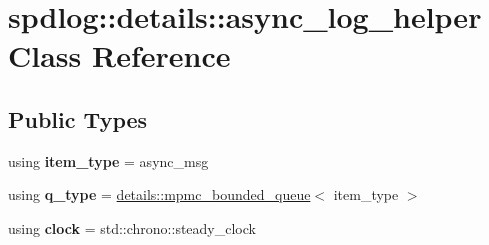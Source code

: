 \hypertarget{classspdlog_1_1details_1_1async__log__helper}{}\section{spdlog\+:\+:details\+:\+:async\+\_\+log\+\_\+helper Class Reference}
\label{classspdlog_1_1details_1_1async__log__helper}
\subsection*{Public Types}
\begin{DoxyCompactItemize}
\item 
using {\bfseries item\+\_\+type} = async\+\_\+msg\hypertarget{classspdlog_1_1details_1_1async__log__helper_a697d7c2f16fe34871f560eeb50bdb8f9}{}\label{classspdlog_1_1details_1_1async__log__helper_a697d7c2f16fe34871f560eeb50bdb8f9}

\item 
using {\bfseries q\+\_\+type} = \hyperlink{classspdlog_1_1details_1_1mpmc__bounded__queue}{details\+::mpmc\+\_\+bounded\+\_\+queue}$<$ item\+\_\+type $>$\hypertarget{classspdlog_1_1details_1_1async__log__helper_adc1eff190d4b041a9f90232c7097581a}{}\label{classspdlog_1_1details_1_1async__log__helper_adc1eff190d4b041a9f90232c7097581a}

\item 
using {\bfseries clock} = std\+::chrono\+::steady\+\_\+clock\hypertarget{classspdlog_1_1details_1_1async__log__helper_adeafd5c2590273a1f2bbfc0f26fe9075}{}\label{classspdlog_1_1details_1_1async__log__helper_adeafd5c2590273a1f2bbfc0f26fe9075}

\end{DoxyCompactItemize}

